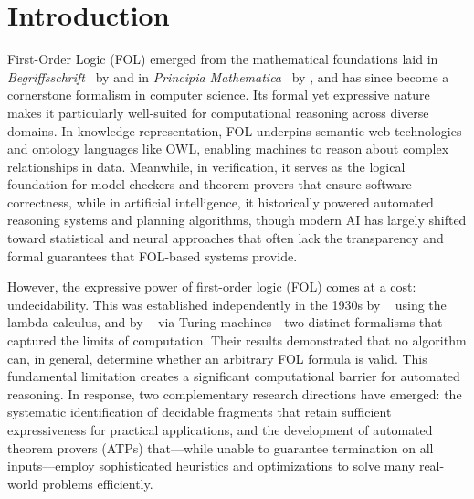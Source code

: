 \newpage\pagestyle{introduction}


\chapter*{Introduction}

First-Order Logic (FOL) emerged from the mathematical foundations laid in \textit{Begriffsschrift}~\cite{frege1879} by \citeauthor{frege1879} and in \textit{Principia Mathematica}~\cite{russell1910} by \citeauthor{russell1910}, and has since become a cornerstone formalism in computer science.
Its formal yet expressive nature makes it particularly well-suited for computational reasoning across diverse domains.
In knowledge representation, FOL underpins semantic web technologies and ontology languages like OWL, enabling machines to reason about complex relationships in data.
Meanwhile, in verification, it serves as the logical foundation for model checkers and theorem provers that ensure software correctness, while in artificial intelligence, it historically powered automated reasoning systems and planning algorithms, though modern AI has largely shifted toward statistical and neural approaches that often lack the transparency and formal guarantees that FOL-based systems provide.

However, the expressive power of first-order logic (FOL) comes at a cost: undecidability.
This was established independently in the 1930s by \citeauthor{church1936}~\cite{church1936} using the lambda calculus, and by \citeauthor{turing1936}~\cite{turing1936} via Turing machines---two distinct formalisms that captured the limits of computation.
Their results demonstrated that no algorithm can, in general, determine whether an arbitrary FOL formula is valid. This fundamental limitation creates a significant computational barrier for automated reasoning.
In response, two complementary research directions have emerged: the systematic identification of decidable fragments that retain sufficient expressiveness for practical applications, and the development of automated theorem provers (ATPs) that---while unable to guarantee termination on all inputs---employ sophisticated heuristics and optimizations to solve many real-world problems efficiently.

